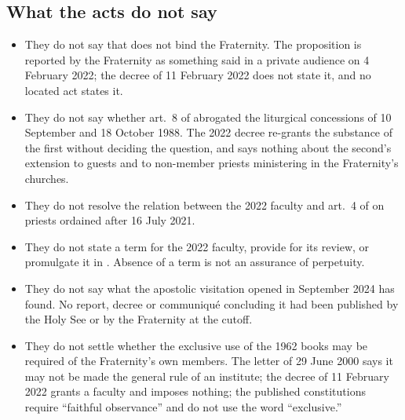 \subsection{What the acts do not say}

\begin{itemize}
\item They do not say that  does not bind the
Fraternity. The proposition is reported by the Fraternity as something
said in a private audience on 4 February 2022; the decree of 11 February
2022 does not state it, and no located act states it.
\item They do not say whether art.~8 of 
abrogated the liturgical concessions of 10 September and 18 October 1988.
The 2022 decree re-grants the substance of the first without deciding the
question, and says nothing about the second's extension to guests and to
non-member priests ministering in the Fraternity's churches.
\item They do not resolve the relation between the 2022 faculty and
art.~4 of  on priests ordained after 16 July
2021.
\item They do not state a term for the 2022 faculty, provide for its
review, or promulgate it in . Absence of a
term is not an assurance of perpetuity.
\item They do not say what the apostolic visitation opened in September
2024 has found. No report, decree or communiqué concluding it had been
published by the Holy See or by the Fraternity at the cutoff.
\item They do not settle whether the exclusive use of the 1962 books may
be required of the Fraternity's own members. The letter of 29 June 2000
says it may not be made the general rule of an institute; the decree of 11
February 2022 grants a faculty and imposes nothing; the published
constitutions require ``faithful observance'' and do not use the word
``exclusive.''
\end{itemize}

